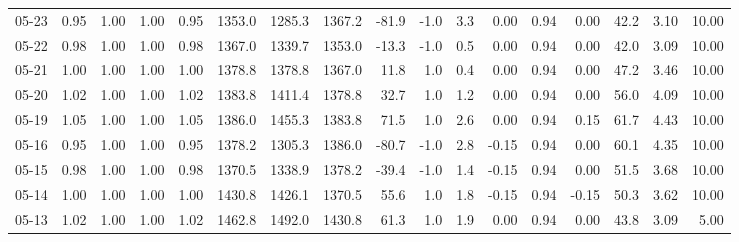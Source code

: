 \begin{threeparttable}
{\begin{tabular}{lrrrrrrrrrrrrrrrr}
  05-23 &         0.95 &           1.00 &          1.00 &          0.95 & 1353.0 & 1285.3 & 1367.2 &      -81.9 &                     -1.0 &                 3.3 &       0.00 &      0.94 &           0.00 &             42.2 &            3.10 &                  10.00 \\
  05-22 &         0.98 &           1.00 &          1.00 &          0.98 & 1367.0 & 1339.7 & 1353.0 &      -13.3 &                     -1.0 &                 0.5 &       0.00 &      0.94 &           0.00 &             42.0 &            3.09 &                  10.00 \\
  05-21 &         1.00 &           1.00 &          1.00 &          1.00 & 1378.8 & 1378.8 & 1367.0 &       11.8 &                      1.0 &                 0.4 &       0.00 &      0.94 &           0.00 &             47.2 &            3.46 &                  10.00 \\
  05-20 &         1.02 &           1.00 &          1.00 &          1.02 & 1383.8 & 1411.4 & 1378.8 &       32.7 &                      1.0 &                 1.2 &       0.00 &      0.94 &           0.00 &             56.0 &            4.09 &                  10.00 \\
  05-19 &         1.05 &           1.00 &          1.00 &          1.05 & 1386.0 & 1455.3 & 1383.8 &       71.5 &                      1.0 &                 2.6 &       0.00 &      0.94 &           0.15 &             61.7 &            4.43 &                  10.00 \\
  05-16 &         0.95 &           1.00 &          1.00 &          0.95 & 1378.2 & 1305.3 & 1386.0 &      -80.7 &                     -1.0 &                 2.8 &      -0.15 &      0.94 &           0.00 &             60.1 &            4.35 &                  10.00 \\
  05-15 &         0.98 &           1.00 &          1.00 &          0.98 & 1370.5 & 1338.9 & 1378.2 &      -39.4 &                     -1.0 &                 1.4 &      -0.15 &      0.94 &           0.00 &             51.5 &            3.68 &                  10.00 \\
  05-14 &         1.00 &           1.00 &          1.00 &          1.00 & 1430.8 & 1426.1 & 1370.5 &       55.6 &                      1.0 &                 1.8 &      -0.15 &      0.94 &          -0.15 &             50.3 &            3.62 &                  10.00 \\
  05-13 &         1.02 &           1.00 &          1.00 &          1.02 & 1462.8 & 1492.0 & 1430.8 &       61.3 &                      1.0 &                 1.9 &       0.00 &      0.94 &           0.00 &             43.8 &            3.09 &                   5.00 \\

\end{tabular}}
\end{threeparttable}
